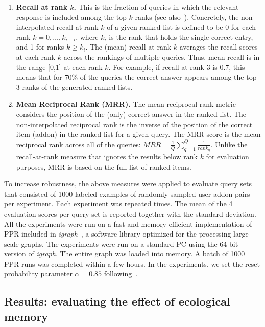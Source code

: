 \documentclass[10pt,letterpaper]{article}
\begin{document}
\begin{enumerate}
\item  \textbf{Recall at rank $k$.} This is the fraction of queries in which the relevant response is included among the top $k$ ranks (see also~\cite{minkov2010improving}). Concretely, the non-interpolated recall at rank $k$ of a given ranked list is defined to be 0 for each rank $k = 0, \dots, k_{i-i}$, where $k_i$ is the rank that holds the single correct entry, and 1 for ranks $k \ge k_i$. The (mean) recall at rank $k$ averages the recall scores at each rank $k$ across the rankings of multiple queries. Thus, mean recall is in the range [0,1] at each rank $k$. For example, if recall at rank 3 is 0.7, this means that for 70\% of the queries the correct answer appears among the top 3 ranks of the generated ranked lists.

\item  \textbf{Mean Reciprocal Rank (MRR). }The mean reciprocal rank metric~\cite{voorhees1999trec} considers the position of the (only) correct answer in the ranked list. The non-interpolated reciprocal rank is the inverse of the position of the correct item (addon) in the ranked list for a given query. The MRR score is the mean reciprocal rank across all of the queries: $MRR = \frac{1}{Q} \sum_{q=1}^Q \frac{1}{rank_q}$. Unlike the recall-at-rank measure that ignores the results below rank $k$ for evaluation purposes, MRR is based on the full list of ranked items. 
\end{enumerate}

To increase robustness, the above measures were applied to evaluate query sets that consisted of 1000 labeled examples of randomly sampled user-addon pairs per experiment. Each experiment was repeated times. The mean of the 4 evaluation scores per query set is reported together with the standard deviation. All the experiments were run on a fast and memory-efficient implementation of PPR included in\textit{ igraph}~\cite{igraph}, a software library optimized for the processing large-scale graphs. The experiments were run on a standard PC using the 64-bit version of \textit{igraph}. The entire graph was loaded into memory. A batch of 1000 PPR runs was completed within a few hours. In the experiments, we set the reset probability parameter $\alpha = 0.85$ following~\cite{boldi2005totalrank}.

\subsection*{Results: evaluating the effect of ecological memory}
\end{document}
